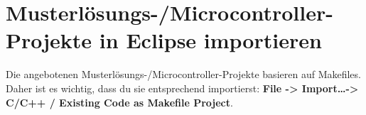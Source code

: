 \section*{Musterlösungs-/Microcontroller-Projekte in Eclipse importieren}


Die angebotenen Musterlösungs-/Microcontroller-Projekte basieren auf Makefiles.
Daher ist es wichtig, dass du sie entsprechend importierst: \textbf{File -> Import\dots -> C/C++ / Existing Code as Makefile Project}.